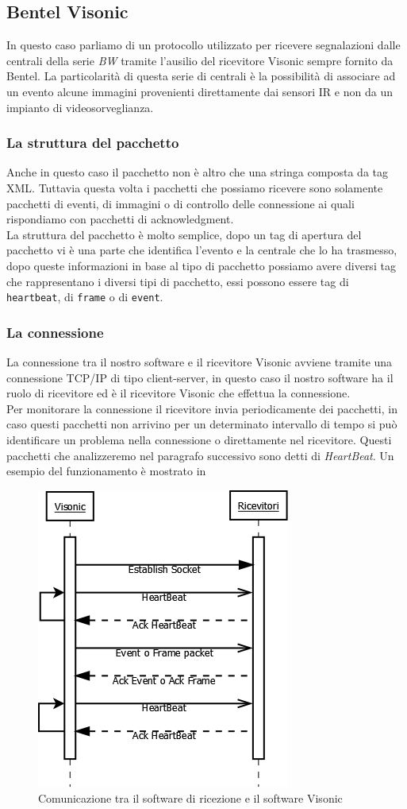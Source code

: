 \subsection{Bentel Visonic}
In questo caso parliamo  di un protocollo utilizzato per ricevere segnalazioni dalle centrali della serie \emph{BW} tramite l'ausilio del ricevitore Visonic sempre fornito da Bentel. La particolarità di questa serie di centrali è la possibilità di associare ad un evento alcune immagini provenienti direttamente dai sensori IR e non da un impianto di videosorveglianza.
\subsubsection{La struttura del pacchetto}
Anche in questo caso il pacchetto non è altro che una stringa composta da tag XML. Tuttavia questa volta i pacchetti che possiamo ricevere sono solamente pacchetti di eventi, di immagini o di controllo delle connessione ai quali rispondiamo con pacchetti di acknowledgment.\\
La struttura del pacchetto è molto semplice, dopo un tag di apertura del pacchetto vi è una parte che identifica l'evento e la centrale che lo ha trasmesso, dopo queste informazioni in base al tipo di pacchetto possiamo avere diversi tag che rappresentano i diversi tipi di pacchetto, essi possono essere tag di \texttt{heartbeat}, di \texttt{frame} o di \texttt{event}.
\subsubsection{La connessione}
La connessione tra il nostro software e il ricevitore Visonic avviene tramite una connessione TCP/IP di tipo client-server, in questo caso il nostro software ha il ruolo di ricevitore ed è il ricevitore Visonic che effettua la connessione.\\
Per monitorare la connessione il ricevitore invia periodicamente dei pacchetti, in caso questi pacchetti non arrivino per un determinato intervallo di tempo si può identificare un problema nella connessione o direttamente nel ricevitore. Questi pacchetti che analizzeremo nel paragrafo successivo sono detti di \emph{HeartBeat}. Un esempio del funzionamento è mostrato in 
\begin{figure}
	\centering
	\includegraphics[width=0.5\linewidth]{pictures/convisonic.png}
	\caption{Comunicazione tra il software di ricezione e il software Visonic}\label{fig:convisonic}
\end{figure}
